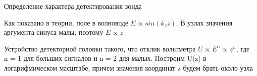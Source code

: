 \documentclass[12pt]{beamer}
\begin{document}
\begin{frame}{Определение характера детектирования зонда}

    \begin{block}{}
        Как показано в теории, поле в волноводе $E \propto sin (k_z z)$. В узлах значения аргумента синуса малы, поэтому $E \propto z$
    \end{block}
    
    \begin{block}{}
        Устройство детекторной головки такого, что отклик вольтметра $U \propto E^n \propto z^n$, где n = 1 для больших сигналов и n = 2 для малых. Построим U(z) в логарифмическом масштабе, причем значения координат z будем брать около узла
    \end{block}
    
\end{frame}
\end{document}

